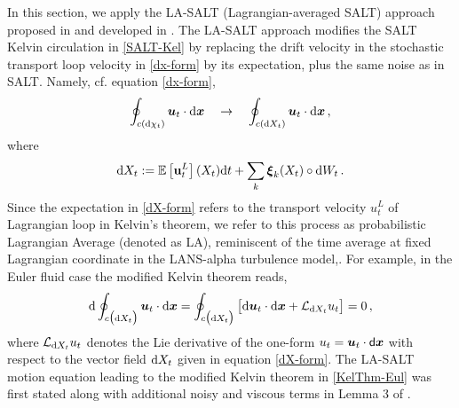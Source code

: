 \documentclass[11pt, oneside]{article}   	%
\numberwithin{equation}{section}
\theoremstyle{plain}
\theoremstyle{definition}
\theoremstyle{remark}
\newcommand{\<}{\langle}
\renewcommand{\>}{\rangle}
\def\diff{\textnormal{d}}
\def\u{{\bf{u}}}
\def\rmd{{\mathrm{d}}}
\newcommand{\mb}[1]{\mbox{\boldmath{$#1$}}}
\newcommand{\E}[1]{\mathbb{E}\left[{#1}\right]}
\begin{document}
In this section, we apply the LA-SALT (Lagrangian-averaged SALT) approach proposed in \cite{DrivasHolm2019} and developed in \cite{DrivasHolmLeahy2020}. The LA-SALT approach modifies the SALT Kelvin circulation in \eqref{SALT-Kel} by replacing the drift velocity in the stochastic transport loop velocity in \eqref{dx-form} by its expectation, plus the same noise as in SALT. Namely, cf. equation \eqref{dx-form},
\begin{align}\label{KelThm-form}
\oint_{c({\diff} \chi_t)} \mb{u}_t  \cdot {\rmd} \mb x
\quad\to \quad
\oint_{c({\diff} X_t )} \mb{u}_t \cdot {\rmd} \mb x\,,
\end{align}
where 
\begin{align}\label{dX-form}
 \diff  X_t := \E{\u^L_t}(X_t) \diff t+ \displaystyle\sum_k {\mb \xi_k (X_t)} \circ \diff W_t
\,.
\end{align}
Since the expectation in \eqref{dX-form} refers to the transport velocity $u^L_t$ of Lagrangian loop in Kelvin's theorem, we refer to this process as probabilistic Lagrangian Average (denoted as LA), reminiscent of the time average at fixed Lagrangian coordinate in the LANS-alpha turbulence model,\cite{Chen-etal1998,Chen-etal1999,Chen-etal1999+,Foiasetal01,Foiasetal02}.
For example, in the Euler fluid case the modified Kelvin theorem reads,
\begin{align}\label{KelThm-Eul}
\diff  \oint_{c\big({\diff} X_t \big)} \mb{u}_t  \cdot {\rmd} \mb x
 =  
\oint_{c\big({\diff} X_t \big)}
\big[ \diff{\mb{u}_t} \cdot {\rmd} \mb x+  \mathcal{L}_{\diff X_t} u_t \big]
= 0 \,,
\end{align}
where $ \mathcal{L}_{ {\diff}X_t}u_t $ denotes the Lie derivative of the one-form 
$u_t = \mb{u}_t \cdot \sf d \mb{x}$ with respect to the vector field $ \diff X_t$ given in equation \eqref{dX-form}. The LA-SALT motion equation leading to the modified Kelvin theorem in \eqref{KelThm-Eul} was first stated along with additional noisy and viscous terms in Lemma 3 of \cite{DrivasHolm2019}. 


\end{document}
